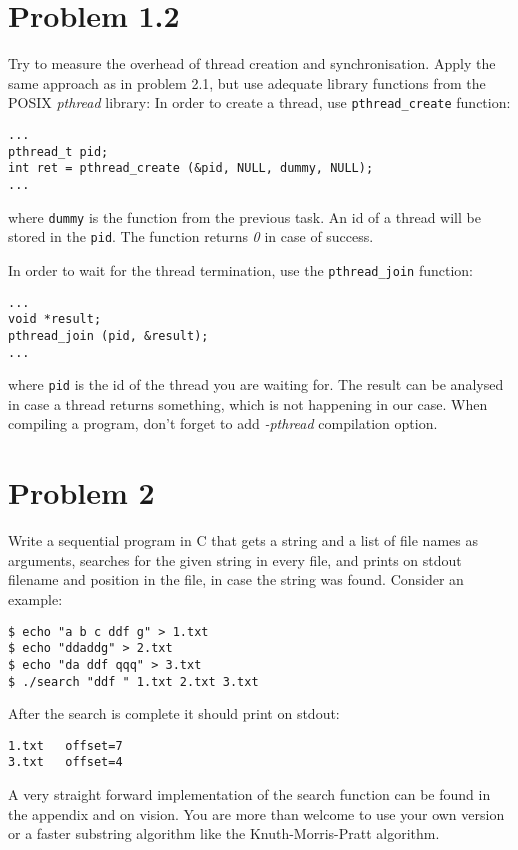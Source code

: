 \documentclass[a4paper,10pt]{scrartcl}
\begin{document}
    \section{Problem 1.2}
    Try to measure the overhead of thread creation and synchronisation.
    Apply the same approach as in problem 2.1, but use adequate library
    functions from the POSIX \textit{pthread} library:
    In order to create a thread, use \verb|pthread_create|
    function:
\begin{verbatim}
...
pthread_t pid;
int ret = pthread_create (&pid, NULL, dummy, NULL);
...
\end{verbatim}
    where \verb|dummy| is the function from the previous task.  An id
    of a thread will be stored in the \verb|pid|. The function returns
    \textit{0} in case of success.

    In order to wait for the thread termination, use the \verb|pthread_join|
    function:
\begin{verbatim}
...
void *result;
pthread_join (pid, &result);
...
\end{verbatim}
    where \verb|pid| is the id of the thread you are waiting for.
    The result can be analysed in
    case a thread returns something, which is not happening in our case.
    When compiling a program, don't forget to add \textit{-pthread}
    compilation option.

    \section{Problem 2}
    Write a sequential program in C that gets a string and a list of
    file names as arguments, searches for the given string in every file, and
    prints on stdout filename and position in the file, in case the
    string was found.  Consider an example:
    \begin{verbatim}
$ echo "a b c ddf g" > 1.txt
$ echo "ddaddg" > 2.txt
$ echo "da ddf qqq" > 3.txt
$ ./search "ddf " 1.txt 2.txt 3.txt
    \end{verbatim}
    After the search is complete it should print on stdout:
    \begin{verbatim}
1.txt   offset=7
3.txt   offset=4
    \end{verbatim}

    A very straight forward implementation of the search function can be
    found in the appendix and on vision.  You are more than welcome to use your own
    version or a faster substring algorithm like the Knuth-Morris-Pratt
    algorithm.
\end{document}
